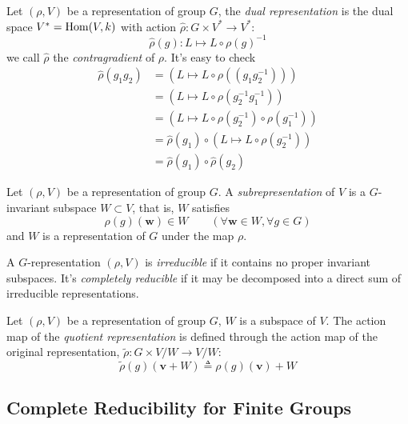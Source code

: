 \begin{defn}
  Let $(\rho, V)$ be a representation of group $G$, the \emph{dual
    representation} is the dual space $V^* = \operatorname{Hom}(V,k)$ with action $\hat{\rho} : G
  \times V^* \to V^*$:
  \[
    \hat{\rho}(g) : L \mapsto L \circ \rho(g)^{-1}
  \]
  we call $\hat{\rho}$ the \emph{contragradient} of $\rho$.  It's easy to check
  \begin{align*}
    \hat{\rho}(g_1g_2) & = (L \mapsto L \circ \rho((g_1g_2^{-1})))\\
                       & = (L \mapsto L \circ \rho(g_2^{-1}g_1^{-1}))\\
                       & = (L \mapsto L \circ \rho(g_2^{-1}) \circ \rho(g_1^{-1}))\\
                       & = \hat{\rho}(g_1) \circ (L \mapsto L \circ \rho(g_2^{-1}))\\
                       & = \hat{\rho}(g_1) \circ \hat{\rho}(g_2)
  \end{align*}
\end{defn}

\begin{defn}[Subrepresentation]
  Let $(\rho, V)$ be a representation of group $G$. A \emph{subrepresentation}
  of $V$ is a $G$-invariant subspace $W \subset V$, that is, $W$ satisfies
  \[
    \rho(g)(\bm{w}) \in W \qquad (\forall \bm{w} \in W, \forall g \in G)
  \]
  and $W$ is a representation of $G$ under the map $\rho$.
\end{defn}

\begin{defn}[Reducibility]
  A $G$-representation $(\rho, V)$ is \emph{irreducible} if it contains no
  proper invariant subspaces.  It's \emph{completely reducible} if it may be
  decomposed into a direct sum of irreducible representations.
\end{defn}

\begin{defn}
  Let $(\rho, V)$ be a representation of group $G$, $W$ is a subspace of $V$.
  The action map of the \emph{quotient representation} is defined through the
  action map of the original representation, $\widetilde{\rho} : G \times V/W \to V/W$:
  \[
    \widetilde{\rho}(g)(\bm{v} + W) \triangleq \rho(g)(\bm{v}) + W
  \]
\end{defn}

\subsection{Complete Reducibility for Finite Groups}

